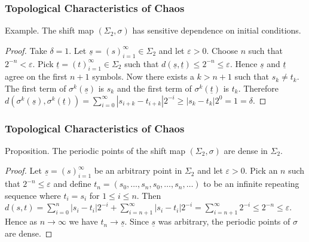 \documentclass{beamer}
\begin{document}
\begin{frame}
    \frametitle{Topological Characteristics of Chaos}
    \begin{block}{Example.}
        The shift map $(\Sigma_2, \sigma)$ has sensitive dependence on initial conditions.
        \begin{proof}
            Take $\delta = 1$. Let $\underline{s} = (s)_{i=1}^{\infty} \in \Sigma_2$ and let $\varepsilon > 0$. Choose $n$ such that $2^{-n} < \varepsilon$. Pick $\underline{t} = (t)_{i=1}^{\infty} \in \Sigma_2$ such that $d(\underline{s}, \underline{t}) \leq 2^{-n} \leq \varepsilon$. Hence $\underline{s}$ and $\underline{t}$ agree on the first $n+1$ symbols. Now there exists a $k > n + 1$ such that $s_k \neq t_k$. The first term of $\sigma^k(\underline{s})$ is $s_k$ and the first term of $\sigma^k(\underline{t})$ is $t_k$. Therefore $d(\sigma^k(\underline{s}), \sigma^k(\underline{t})) = \sum_{i = 0}^{\infty}|s_{i+k} - t_{i+k}|2^{-i} \geq |s_k - t_k|2^{0} = 1 = \delta$.
        \end{proof}
    \end{block}
\end{frame}

\begin{frame}
    \frametitle{Topological Characteristics of Chaos}
    \begin{block}{Proposition.}
        The periodic points of the shift map $(\Sigma_2, \sigma)$ are dense in $\Sigma_2$. \cite{devaney}
    \begin{proof}
        Let $\underline{s} = (s)_{i=1}^{\infty}$ be an arbitrary point in $\Sigma_2$ and let $\varepsilon > 0$. Pick an $n$ such that $2^{-n} \leq \varepsilon$ and define $t_n = (s_0, \dots, s_n, s_0, \dots, s_n, \dots)$ to be an infinite repeating sequence where $t_i = s_i$ for $1 \leq i \leq n$. Then $d(s, t) = \sum_{i = 0}^n|s_i - t_i|2^{-i} + \sum_{i=n+1}^{\infty}|s_i - t_i|2^{-i} = \sum_{i = n+1}^{\infty}2^{-i} \leq 2^{-n} \leq \varepsilon$. Hence as $n \to \infty$ we have $t_n \to \underline{s}$. Since $\underline{s}$ was arbitrary, the periodic points of $\sigma$ are dense.
    \end{proof}
    \end{block}
\end{frame}
\end{document}

